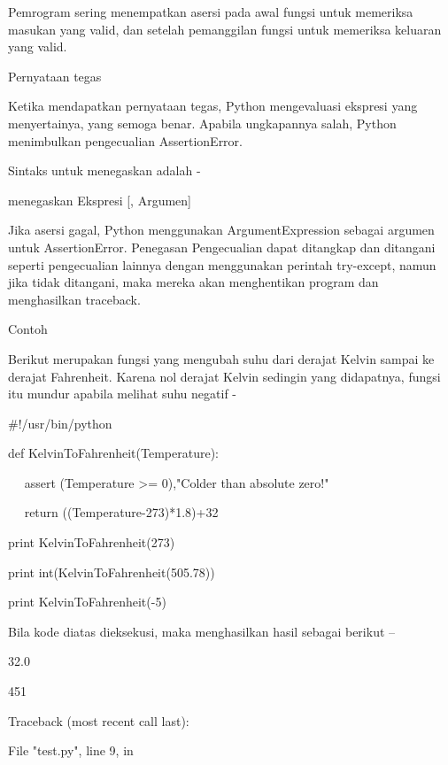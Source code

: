 \vspace{12pt}
Pemrogram sering menempatkan asersi pada awal fungsi untuk memeriksa masukan yang valid, dan setelah pemanggilan fungsi untuk memeriksa keluaran yang valid. \par
Pernyataan tegas \par
\vspace{12pt}
Ketika mendapatkan pernyataan tegas, Python mengevaluasi ekspresi yang menyertainya, yang semoga benar. Apabila ungkapannya salah, Python menimbulkan pengecualian AssertionError. \par
\vspace{12pt}
Sintaks untuk menegaskan adalah - \par
\vspace{12pt}
menegaskan Ekspresi [, Argumen] \par
\vspace{12pt}
Jika asersi gagal, Python menggunakan ArgumentExpression sebagai argumen untuk AssertionError. Penegasan Pengecualian dapat ditangkap dan ditangani seperti pengecualian lainnya dengan menggunakan perintah try-except, namun jika tidak ditangani, maka mereka akan menghentikan program dan menghasilkan traceback. \par
Contoh \par
\vspace{12pt}
Berikut merupakan fungsi yang mengubah suhu dari derajat Kelvin sampai ke derajat Fahrenheit. Karena nol derajat Kelvin sedingin yang didapatnya, fungsi itu mundur apabila melihat suhu negatif - \par
 $  \#  $!/usr/bin/python \par
def KelvinToFahrenheit(Temperature): \par
~~ assert (Temperature >= 0),"Colder than absolute zero!" \par
~~ return ((Temperature-273)*1.8)+32 \par
print KelvinToFahrenheit(273) \par
print int(KelvinToFahrenheit(505.78)) \par
print KelvinToFahrenheit(-5) \par
\vspace{12pt}
Bila kode diatas dieksekusi, maka menghasilkan hasil sebagai berikut – \par
32.0 \par
451 \par
Traceback (most recent call last): \par
File "test.py", line 9, in  \par
